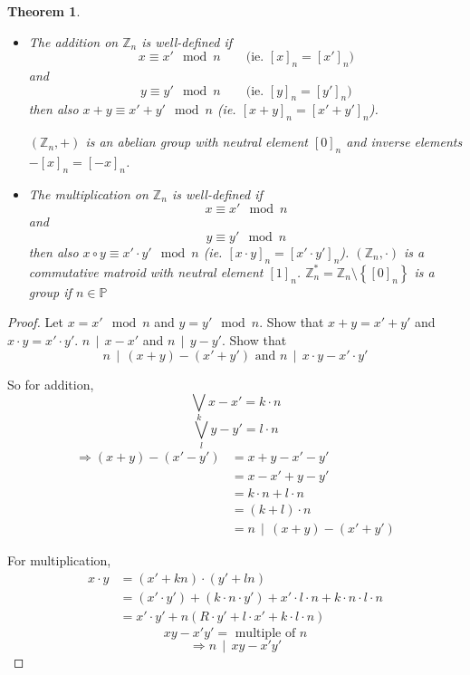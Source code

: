 \documentclass[a4paper,landscape,twocolumn]{article}
\newcommand\set[1]{\left\{#1\right\}}
\newcommand\divides[2]{#1\,\mid\,#2}
\newtheorem{theorem}{Theorem}
\begin{document}
\begin{theorem}
  \label{Satz-2.16}
  \begin{itemize}
    \item[(i)] The addition on $\mathbb{Z}_n$ is well-defined if
      \[ x \equiv x' \mod{n} \qquad \text{(ie. $[x]_n = [x']_n)$} \]
      and
      \[ y \equiv y' \mod{n} \qquad \text{(ie. $[y]_n = [y']_n)$} \]
      then also $x + y \equiv x' + y' \mod{n}$ (ie. $[x+y]_n = [x' + y']_n$).

      $(\mathbb{Z}_n, +)$ is an abelian group with neutral element $[0]_n$
      and inverse elements $-[x]_n = [-x]_n$.
    \item[(ii)] The multiplication on $\mathbb{Z}_n$ is well-defined if
      \[ x \equiv x' \mod{n} \]
      and
      \[ y \equiv y' \mod{n} \]
      then also $x \circ y \equiv x' \cdot y' \mod{n}$ (ie. $[x\cdot y]_n = [x'\cdot y']_n$).
      $(\mathbb{Z}_n, \cdot)$ is a commutative matroid with neutral element $[1]_n$.
      $\mathbb{Z}_n^* = \mathbb{Z}_n \setminus \set{[0]_n}$ is a group if $n \in \mathbb{P}$
  \end{itemize}
\end{theorem}

\begin{proof}
  Let $x = x' \mod{n}$ and $y = y' \mod{n}$. Show that $x + y = x' + y'$ and $x\cdot y = x' \cdot y'$.
  $\divides{n}{x-x'}$ and $\divides{n}{y - y'}$. Show that
  \[ \divides{n}{(x+y) - (x' + y')} \text{ and } \divides{n}{x\cdot y - x'\cdot y'} \]

  So for addition,
  \[ \bigvee_k x - x' = k \cdot n \]
  \[ \bigvee_l y - y' = l \cdot n \]
  \begin{align*}
    \Rightarrow (x + y) - (x' - y')
      &= x + y - x' - y' \\
      &= x - x' + y - y' \\
      &= k \cdot n + l \cdot n \\
      &= (k + l) \cdot n \\
      &= \divides{n}{(x + y) - (x' + y')}
  \end{align*}

  For multiplication,
  \begin{align*}
    x \cdot y
      &= (x' + kn) \cdot (y' + ln) \\
      &= (x' \cdot y') + (k \cdot n \cdot y') + x' \cdot l \cdot n + k \cdot n \cdot l \cdot n \\
      &= x' \cdot y' + n (R\cdot y' + l \cdot x' + k \cdot l \cdot n)
  \end{align*}
  \[ xy - x' y' = \text{ multiple of } n \]
  \[ \Rightarrow \divides{n}{xy - x'y'} \]
\end{proof}
\end{document}
